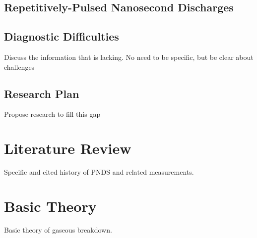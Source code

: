 \subsection{Repetitively-Pulsed Nanosecond Discharges}



\subsection{Diagnostic Difficulties}

Discuss the information that is lacking. No need to be specific, but be clear
about challenges

\subsection{Research Plan}

Propose research to fill this gap

\section{Literature Review}

Specific and cited history of PNDS and related measurements.

\section{Basic Theory}

Basic theory of gaseous breakdown.
